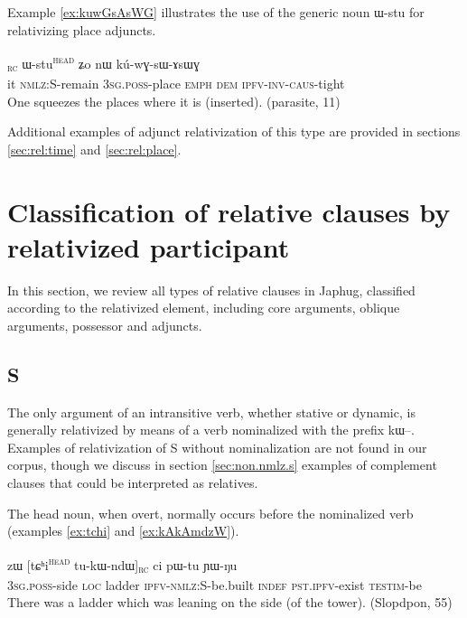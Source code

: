 \documentclass[oldfontcommands,oneside,a4paper,11pt]{article}
\newcommand{\ipa}[1]{{\phon #1}} %
\newcommand{\topic}{\textsc{dem}}
\newcommand{\tete}{\textsuperscript{\textsc{head}}}
\newcommand{\rc}{\textsubscript{\textsc{rc}}}
\begin{document}

Example \ref{ex:kuwGsAsWG} illustrates the use of the generic noun \ipa{ɯ-stu} for relativizing place adjuncts.

\begin{exe}
\ex \label{ex:kuwGsAsWG}
\gll
[\ipa{ɯʑo}  	\ipa{kɯ-rɤʑi}]\rc{}  	\ipa{ɯ-stu}\tete{} \ipa{ʑo} 	\ipa{nɯ}  	\ipa{kú-wɣ-sɯ-ɤsɯɣ}  \\
it \textsc{nmlz:S}-remain \textsc{3sg.poss}-place \textsc{emph} \topic{}  \textsc{ipfv-inv-caus}-tight \\
\glt One squeezes the places where it is (inserted). (parasite, 11)
  \end{exe}

Additional examples of adjunct relativization of this type are provided in sections \ref{sec:rel:time} and \ref{sec:rel:place}.

\section{Classification of relative clauses by relativized participant} 

In this section, we review all types of relative clauses in Japhug, classified according to the relativized element, including core arguments, oblique arguments, possessor and adjuncts.

\subsection{S} \label{sec:s.rel}
The only argument of an intransitive verb, whether stative or dynamic, is generally relativized by means of a verb nominalized with the prefix \ipa{kɯ}--. Examples of relativization of S without nominalization are   not found in our corpus, though we discuss in section \ref{sec:non.nmlz.s} examples of complement clauses that could be interpreted as relatives.

The head noun, when overt, normally occurs   before the nominalized verb (examples \ref{ex:tchi} and \ref{ex:kAkAmdzW}). 

 
 \begin{exe}
   \ex   \label{ex:tchi}
 \gll  	\ipa{ɯ-ɣmbɤj}  	\ipa{zɯ}  	[\ipa{tɕʰi}\tete{}  	\ipa{tu-kɯ-ndɯ}]\rc{}  	\ipa{ci}  	\ipa{pɯ-tu}  	\ipa{ɲɯ-ŋu}  		\\
\textsc{3sg.poss}-side \textsc{loc} ladder \textsc{ipfv-nmlz:S}-be.built  \textsc{indef} \textsc{pst.ipfv}-exist \textsc{testim}-be  \\
 \glt    There was a ladder which was leaning on the side (of the tower). (Slopdpon, 55)
   \end{exe} 
\end{document}
